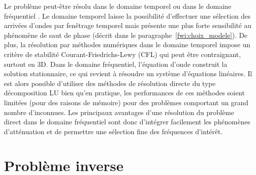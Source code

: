 Le problème peut-être résolu dans le domaine temporel ou dans le domaine fréquentiel \citep{vigh_2008}. Le domaine temporel laisse la possibilité d'effectuer une sélection des arrivées d'ondes par fenêtrage temporel mais présente une plus forte sensibilité au phénomène de saut de phase (décrit dans le paragraphe~\ref{fwi:choix_modele}).  De plus, la résolution par méthodes numériques dans le domaine temporel impose un critère de stabilité Courant-Friedrichs-Lewy (CFL) qui peut être contraignant, surtout en 3D. Dans le domaine fréquentiel, l'équation d'onde construit la solution stationnaire, ce qui revient à résoudre un système d'équations linéaires. Il est alors possible d'utiliser des méthodes de résolution directe du type décomposition LU bien qu'en pratique, les performances de ces méthodes soient limitées (pour des raisons de mémoire) pour des problèmes comportant un grand nombre d'inconnues.  Les principaux avantages d'une résolution du problème direct dans le domaine fréquentiel sont donc d'intégrer facilement les phénomènes d'atténuation et de permettre une sélection fine des fréquences d'intérêt. 







\section{Problème inverse}

